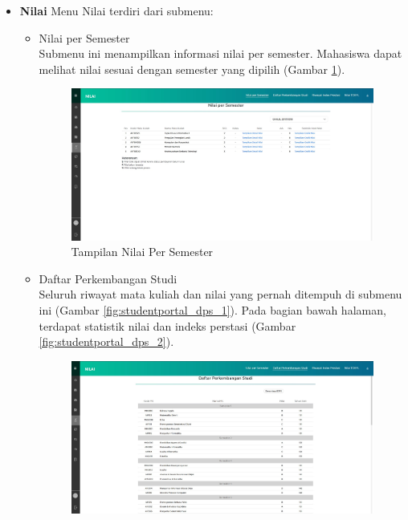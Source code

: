 \begin{enumerate}
\begin{itemize}
\begin{itemize}
\begin{figure}[H]
			\end{figure}
		\end{itemize}
		\item \textbf{Nilai}
		Menu Nilai terdiri dari submenu:
		\begin{itemize}
			\item Nilai per Semester \\
			Submenu ini menampilkan informasi nilai per semester. Mahasiswa dapat melihat nilai sesuai dengan semester yang dipilih (Gambar \ref{fig:studentportal_nilai_per_semester}).
			\begin{figure}[H]
				\centering
				\includegraphics[scale=0.3]{Gambar/studentportal_nilai_per_semester}
				\caption{Tampilan Nilai Per Semester}
				\label{fig:studentportal_nilai_per_semester}
			\end{figure}
			\item Daftar Perkembangan Studi \\
			Seluruh riwayat mata kuliah dan nilai yang pernah ditempuh di submenu ini (Gambar \ref{fig:studentportal_dps_1}). Pada bagian bawah halaman, terdapat statistik nilai dan indeks perstasi (Gambar \ref{fig:studentportal_dps_2}).
			\begin{figure}[H]
				\centering
				\includegraphics[scale=0.3]{Gambar/studentportal_dps_1}

\end{figure}
\end{itemize}
\end{itemize}
\end{enumerate}
